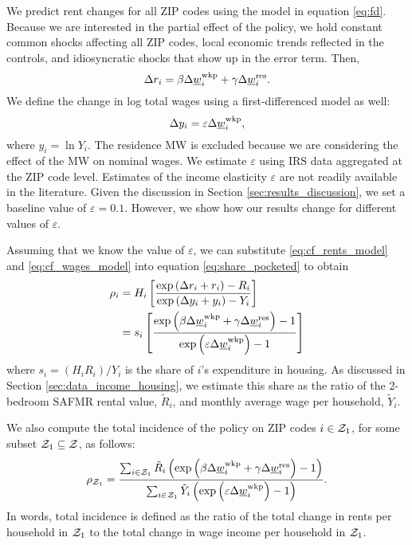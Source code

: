 We predict rent changes for all ZIP codes using the model in equation 
\eqref{eq:fd}.
Because we are interested in the partial effect of the policy, we hold constant 
common shocks affecting all ZIP codes,
local economic trends reflected in the controls, and
idiosyncratic shocks that show up in the error term.
Then,
\begin{equation}\label{eq:cf_rents_model}
    \Delta r_i = \beta \Delta \underline{w}_i^{\text{wkp}} + \gamma \Delta \underline{w}_i^{\text{res}} .
\end{equation}
We define the change in log total wages using a first-differenced model as well:
\begin{equation}\label{eq:cf_wages_model}
    \Delta y_i = \varepsilon \Delta \underline{w}_i^{\text{wkp}} ,
\end{equation}
where $y_i=\ln Y_i$.
The residence MW is excluded because we are considering the effect of the MW on 
nominal wages.
We estimate $\varepsilon$ using IRS data aggregated at the ZIP code level.
Estimates of the income elasticity $\varepsilon$ are not readily available 
in the literature.
Given the discussion in Section \ref{sec:results_discussion}, we set a 
baseline value of $\varepsilon = 0.1$.
However, we show how our results change for different values of $\varepsilon$.

Assuming that we know the value of $\varepsilon$, we can substitute
\eqref{eq:cf_rents_model} and \eqref{eq:cf_wages_model} into equation
\eqref{eq:share_pocketed} to obtain
\begin{equation*}\label{eq:rho}
    \begin{split}
        \rho_i & = H_i \left[ 
        \frac{\exp \left(\Delta r_i + r_i \right) - R_i }
             {\exp \left(\Delta y_i + y_i \right) - Y_i }
        \right] \\
        & = s_i \left[
            \frac{\exp \left( \beta \Delta \underline{w}_i^{\text{wkp}} + \gamma \Delta \underline{w}_i^{\text{res}} \right) - 1 }
                {\exp \left( \varepsilon \Delta \underline{w}_i^{\text{wkp}} \right) - 1 }
            \right]
    \end{split}
\end{equation*}
where $s_i = \left(H_i R_i\right)/Y_i$ is the share of $i$'s expenditure in 
housing.
As discussed in Section \ref{sec:data_income_housing},
we estimate this share as the ratio of the 2-bedroom SAFMR rental value, 
$\tilde R_i$, and monthly average wage per household, $\tilde Y_i$.

We also compute the total incidence of the policy on ZIP codes $i\in\mathcal{Z}_1$,
for some subset $\mathcal{Z}_1\subseteq\mathcal{Z}$, as follows:
\begin{equation*}\label{eq:tot_incidence}
    \rho_{\mathcal{Z}_1} = 
        \frac{\sum_{i\in\mathcal{Z}_1} \tilde R_i \left(\exp \left( \beta \Delta \underline{w}_i^{\text{wkp}} 
                                    + \gamma \Delta \underline{w}_i^{\text{res}} \right) - 1\right) }
            {\sum_{i\in\mathcal{Z}_1} \tilde Y_i \left( \exp \left( \varepsilon \Delta \underline{w}_i^{\text{wkp}} \right) 
                                    - 1\right) } .
\end{equation*}
In words, total incidence is defined as the ratio of the total change in rents
per household in $\mathcal{Z}_1$ to the total change in wage income per household 
in $\mathcal{Z}_1$.

